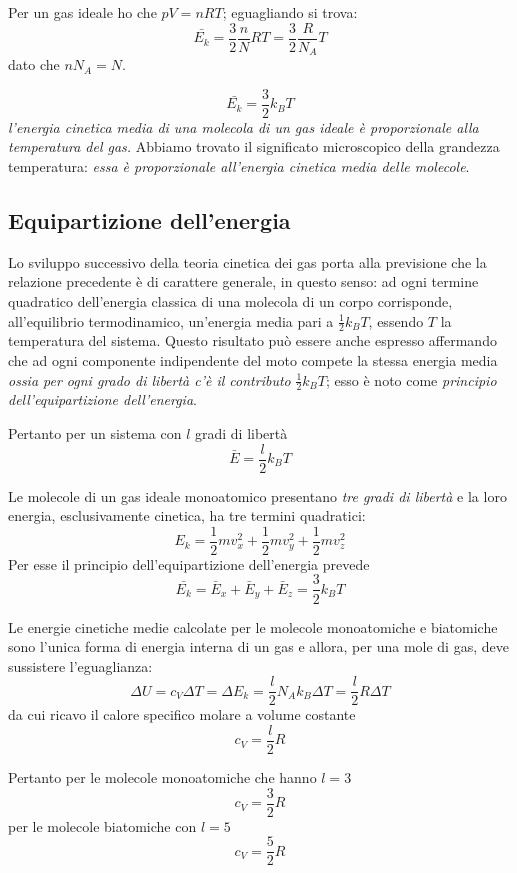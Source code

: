 \documentclass[class=book, crop=false, oneside, 12pt]{standalone}
\begin{document}
Per un gas ideale ho che \(p V = n R T\); eguagliando si trova:
\begin{equation*}
    \bar{E_k} = \frac{3}{2} \frac{n}{N} R T = \frac{3}{2} \frac{R}{N_A} T
\end{equation*}
dato che \(n N_A = N\).

\begin{equation}
    \bar{E_k} = \frac{3}{2} k_B T
\end{equation}
\emph{l'energia cinetica media di una molecola di un gas ideale è proporzionale alla temperatura del gas.}
Abbiamo trovato il significato microscopico della grandezza temperatura: \emph{essa è proporzionale all'energia cinetica media delle molecole}. 

\subsection{Equipartizione dell'energia}
Lo sviluppo successivo della teoria cinetica dei gas porta alla previsione che la relazione precedente è di carattere generale, in questo senso: 
ad ogni termine quadratico dell'energia classica di una molecola di un corpo corrisponde, all'equilibrio termodinamico, un'energia media pari a \(\frac{1}{2} k_B T\), essendo \(T\) la temperatura del sistema. 
Questo risultato può essere anche espresso affermando che ad ogni componente indipendente del moto compete la stessa energia media \emph{ossia per ogni grado di libertà c'è il contributo} \(\frac{1}{2} k_B T\); 
esso è noto come \emph{principio dell'equipartizione dell'energia}. 

Pertanto per un sistema con \(l\) gradi di libertà
\begin{equation}
    \bar{E} = \frac{l}{2} k_B T
\end{equation}

Le molecole di un gas ideale monoatomico presentano \emph{tre gradi di libertà} e la loro energia, esclusivamente cinetica, ha tre termini quadratici:
\begin{equation*}
    E_k = \frac{1}{2} m v_x^2 + \frac{1}{2} m v_y^2 + \frac{1}{2} m v_z^2
\end{equation*}
Per esse il principio dell'equipartizione dell'energia prevede 
\begin{equation*}
    \bar{E_k} = \bar{E}_x + \bar{E}_y + \bar{E}_z = \frac{3}{2} k_B T
\end{equation*}

Le energie cinetiche medie calcolate per le molecole monoatomiche e biatomiche sono l'unica forma di energia interna di un gas e allora, per una mole di gas, deve sussistere l'eguaglianza:
\begin{equation*}
    \Delta U = c_V \Delta T = \Delta E_k = \frac{l}{2} N_A k_B \Delta T = \frac{l}{2} R \Delta T
\end{equation*}
da cui ricavo il calore specifico molare a volume costante
\begin{equation*}
    c_V = \frac{l}{2} R
\end{equation*}

Pertanto per le molecole monoatomiche che hanno \(l = 3\)
\begin{equation*}
    c_V = \frac{3}{2} R
\end{equation*}
per le molecole biatomiche con \(l = 5\)
\begin{equation*}
    c_V = \frac{5}{2} R
\end{equation*}
\end{document}
